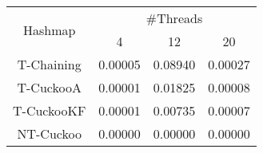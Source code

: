 \begin{tabular}{|c|c|c|c|}
\hline
\multirow{2}{*}{Hashmap} & \multicolumn{3}{c|}{\#Threads}\\\cline{2-4}& 4 & 12 & 20\\
\hline
\hline
T-Chaining & 0.00005 & 0.08940 & 0.00027\\
T-CuckooA & 0.00001 & 0.01825 & 0.00008\\
T-CuckooKF & 0.00001 & 0.00735 & 0.00007\\
NT-Cuckoo & 0.00000 & 0.00000 & 0.00000\\
\hline
\end{tabular}
